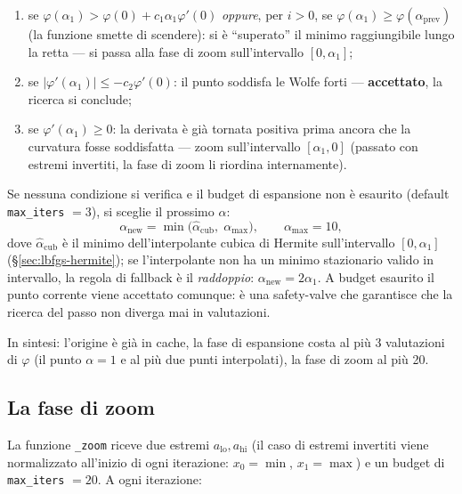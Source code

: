 \begin{enumerate}
\item se $\varphi(\alpha_1) > \varphi(0) + c_1\alpha_1\varphi'(0)$
  \emph{oppure}, per $i>0$, se $\varphi(\alpha_1) \ge \varphi(\alpha_{\mathrm{prev}})$
  (la funzione smette di scendere): si è ``superato'' il minimo
  raggiungibile lungo la retta — si passa alla fase di zoom sull'intervallo
  $[0, \alpha_1]$;
\item se $|\varphi'(\alpha_1)| \le -c_2\varphi'(0)$: il punto soddisfa le
  Wolfe forti — \textbf{accettato}, la ricerca si conclude;
\item se $\varphi'(\alpha_1) \ge 0$: la derivata è già tornata positiva
  prima ancora che la curvatura fosse soddisfatta — zoom sull'intervallo
  $[\alpha_1, 0]$ (passato con estremi invertiti, la fase di zoom li
  riordina internamente).
\end{enumerate}

Se nessuna condizione si verifica e il budget di espansione non è esaurito
(default \texttt{max\_iters} $= 3$), si sceglie il prossimo $\alpha$:
\begin{equation}
\label{eq:expansion-next}
\alpha_{\mathrm{new}} =
\min\bigl(\hat{\alpha}_{\mathrm{cub}},\; \alpha_{\max}\bigr),
\qquad \alpha_{\max} = 10,
\end{equation}
dove $\hat{\alpha}_{\mathrm{cub}}$ è il minimo dell'interpolante cubica di
Hermite sull'intervallo $[0, \alpha_1]$ (\/\S\ref{sec:lbfgs-hermite});
se l'interpolante non ha un minimo stazionario valido in intervallo, la
regola di fallback è il \emph{raddoppio}: $\alpha_{\mathrm{new}} = 2\alpha_1$.
A budget esaurito il punto corrente viene accettato comunque: è una
safety-valve che garantisce che la ricerca del passo non diverga mai in
valutazioni.

In sintesi: l'origine è già in cache, la fase di espansione costa al più
3 valutazioni di $\varphi$ (il punto $\alpha = 1$ e al più due punti
interpolati), la fase di zoom al più 20.

\subsection{La fase di zoom}
\label{sec:lbfgs-zoom}

La funzione \texttt{\_zoom} riceve due estremi $a_{\mathrm{lo}}, a_{\mathrm{hi}}$
(il caso di estremi invertiti viene normalizzato all'inizio di ogni
iterazione: $x_0 = \min$, $x_1 = \max$) e un budget di
\texttt{max\_iters} $= 20$. A ogni iterazione:

